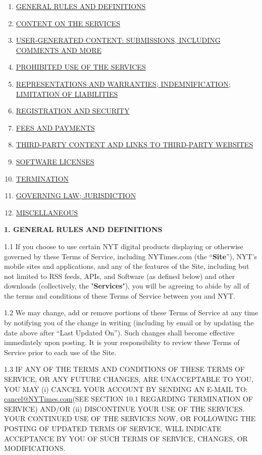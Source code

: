 \begin{enumerate}
\def\labelenumi{\arabic{enumi}.}
\tightlist
\item
  \protect\hyperlink{1}{ GENERAL RULES AND DEFINITIONS}
\item
  \protect\hyperlink{2}{ CONTENT ON THE SERVICES}
\item
  \protect\hyperlink{3}{ USER-GENERATED CONTENT: SUBMISSIONS, INCLUDING
  COMMENTS AND MORE}
\item
  \protect\hyperlink{4}{ PROHIBITED USE OF THE SERVICES}
\item
  \protect\hyperlink{5}{ REPRESENTATIONS AND WARRANTIES;
  INDEMNIFICATION; LIMITATION OF LIABILITIES}
\item
  \protect\hyperlink{6}{ REGISTRATION AND SECURITY}
\item
  \protect\hyperlink{7}{ FEES AND PAYMENTS}
\item
  \protect\hyperlink{8}{ THIRD-PARTY CONTENT AND LINKS TO THIRD-PARTY
  WEBSITES}
\item
  \protect\hyperlink{9}{SOFTWARE LICENSES}
\item
  \protect\hyperlink{10}{TERMINATION}
\item
  \protect\hyperlink{11}{ GOVERNING LAW; JURISDICTION}
\item
  \protect\hyperlink{12}{MISCELLANEOUS}
\end{enumerate}

\textbf{1. GENERAL RULES AND DEFINITIONS}

1.1 If you choose to use certain NYT digital products displaying or
otherwise governed by these Terms of Service, including NYTimes.com (the
``\textbf{Site}''), NYT's mobile sites and applications, and any of the
features of the Site, including but not limited to RSS feeds, APIs, and
Software (as defined below) and other downloads (collectively, the
"\textbf{Services}"), you will be agreeing to abide by all of the terms
and conditions of these Terms of Service between you and NYT.

1.2 We may change, add or remove portions of these Terms of Service at
any time by notifying you of the change in writing (including by email
or by updating the date above after ``Last Updated On''). Such changes
shall become effective immediately upon posting. It is your
responsibility to review these Terms of Service prior to each use of the
Site.

1.3 IF ANY OF THE TERMS AND CONDITIONS OF THESE TERMS OF SERVICE, OR ANY
FUTURE CHANGES, ARE UNACCEPTABLE TO YOU, YOU MAY (i) CANCEL YOUR ACCOUNT
BY SENDING AN E-MAIL TO:
\href{mailto:cancel@NYTimes.com}{cancel@NYTimes.com}(SEE SECTION 10.1
REGARDING TERMINATION OF SERVICE) AND/OR (ii) DISCONTINUE YOUR USE OF
THE SERVICES. YOUR CONTINUED USE OF THE SERVICES NOW, OR FOLLOWING THE
POSTING OF UPDATED TERMS OF SERVICE, WILL INDICATE ACCEPTANCE BY YOU OF
SUCH TERMS OF SERVICE, CHANGES, OR MODIFICATIONS.

